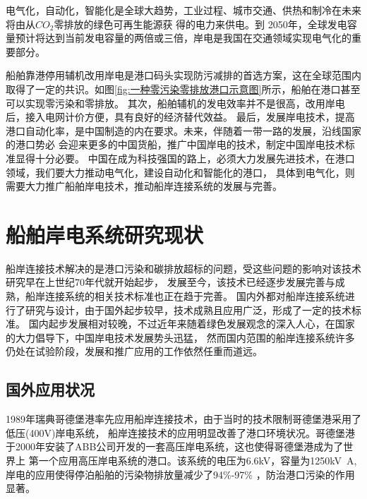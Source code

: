 \begin{table}[!htp]
	\centering
	\caption[中国岸电替代辅机发电的减排表现]{中国岸电替代辅机发电的减排表现\cite{SP3}}
	\label{tab:岸电替代效益}
\end{table}

电气化，自动化，智能化是全球大趋势，工业过程、城市交通、供热和制冷在未来将由从$CO_{2}$零排放的绿色可再生能源获
得的电力来供电。到 2050年，全球发电容量预计将达到当前发电容量的两倍或三倍，岸电是我国在交通领域实现电气化的重要部分。

船舶靠港停用辅机改用岸电是港口码头实现防污减排的首选方案，这在全球范围内取得了一定的共识。如图\ref{fig:一种零污染零排放港口示意图}所示，船舶在港口甚至可以实现零污染和零排放。
其次，船舶辅机的发电效率并不是很高，改用岸电后，接入电网计价方便，具有良好的经济替代效益。
最后，发展岸电技术，提高港口自动化率，是中国制造的内在要求。未来，伴随着一带一路的发展，沿线国家的港口势必
会迎来更多的中国货船，推广中国岸电的技术，制定中国岸电技术标准显得十分必要。
中国在成为科技强国的路上，必须大力发展先进技术，在港口领域，我们要大力推动电气化，建设自动化和智能化的港口，
具体到电气化，则需要大力推广船舶岸电技术，推动船岸连接系统的发展与完善。

\section{船舶岸电系统研究现状}
船岸连接技术解决的是港口污染和碳排放超标的问题，受这些问题的影响对该技术研究早在上世纪70年代就开始起步，
发展至今，该技术已经逐步发展完善与成熟，船岸连接系统的相关技术标准也正在趋于完善。
国内外都对船岸连接系统进行了研究与设计，由于国外起步较早，技术成熟且应用广泛，形成了一定的技术标准。
国内起步发展相对较晚，不过近年来随着绿色发展观念的深入人心，在国家的大力倡导下，中国岸电技术发展势头迅猛，
然而国内范围的船岸连接系统许多仍处在试验阶段，发展和推广应用的工作依然任重而道远\cite{SP4}。

\subsection{国外应用状况}
1989年瑞典哥德堡港率先应用船岸连接技术，由于当时的技术限制哥德堡港采用了低压(400V)岸电系统，
船岸连接技术的应用明显改善了港口环境状况。哥德堡港于2000年安装了ABB公司开发的一套高压岸电系统，这也使得哥德堡港成为了世界上
第一个应用高压岸电系统的港口。该系统的电压为6.6kV，容量为1250\si{kV.A},岸电的应用使得停泊船舶的污染物排放量减少了94\%-97\%
\cite{SP4}，防治港口污染的作用显著。

